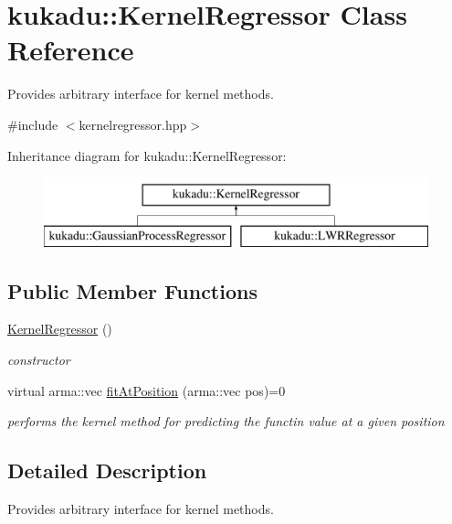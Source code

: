 \hypertarget{classkukadu_1_1KernelRegressor}{\section{kukadu\-:\-:Kernel\-Regressor Class Reference}
\label{classkukadu_1_1KernelRegressor}
}


Provides arbitrary interface for kernel methods.  




{\ttfamily \#include $<$kernelregressor.\-hpp$>$}

Inheritance diagram for kukadu\-:\-:Kernel\-Regressor\-:\begin{figure}[H]
\begin{center}
\leavevmode
\includegraphics[height=2.000000cm]{classkukadu_1_1KernelRegressor}
\end{center}
\end{figure}
\subsection*{Public Member Functions}
\begin{DoxyCompactItemize}
\item 
\hypertarget{classkukadu_1_1KernelRegressor_a9b1048e4eb0cbc70797e27909f886e1a}{\hyperlink{classkukadu_1_1KernelRegressor_a9b1048e4eb0cbc70797e27909f886e1a}{Kernel\-Regressor} ()}\label{classkukadu_1_1KernelRegressor_a9b1048e4eb0cbc70797e27909f886e1a}

\begin{DoxyCompactList}\small\item\em constructor \end{DoxyCompactList}\item 
virtual arma\-::vec \hyperlink{classkukadu_1_1KernelRegressor_afd1489310e11cff4bd88390ba76c38e1}{fit\-At\-Position} (arma\-::vec pos)=0
\begin{DoxyCompactList}\small\item\em performs the kernel method for predicting the functin value at a given position \end{DoxyCompactList}\end{DoxyCompactItemize}


\subsection{Detailed Description}
Provides arbitrary interface for kernel methods. 

